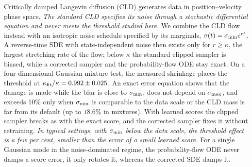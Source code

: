 Critically damped Langevin diffusion (CLD) generates data in position--velocity phase space.
\emph{The standard CLD specifies its noise through a stochastic differential equation and never meets the threshold studied here.}
We combine the CLD flow instead with an isotropic noise schedule specified by its marginals, $\sigma(t)=\sigma_{\min} e^{rt}$.
A reverse-time SDE with state-independent noise then exists only for $r\geq\kappa$, the largest stretching rate of the flow; below $\kappa$ the standard clipped sampler is biased, while a corrected sampler and the probability-flow ODE stay exact.
On a four-dimensional Gaussian-mixture test, the measured shrinkage places the threshold at $\kappa_{\rm fit}/\kappa = 0.992 \pm 0.025$.
An exact error equation shows that the damage is made while the blur is close to $\sigma_{\min}$, does not depend on $\sigma_{\max}$, and exceeds 10\% only when $\sigma_{\min}$ is comparable to the data scale or the CLD mass is far from its default (up to $18.6\%$ in mixtures).
With learned scores the clipped sampler breaks as with the exact score, and the corrected sampler fixes it without retraining.
\emph{In typical settings, with $\sigma_{\min}$ below the data scale, the threshold effect is a few per cent, smaller than the error of a small learned score.}
For a single Gaussian mode in the noise-dominated regime, the probability-flow ODE never damps a score error, it only rotates it, whereas the corrected SDE damps it.
